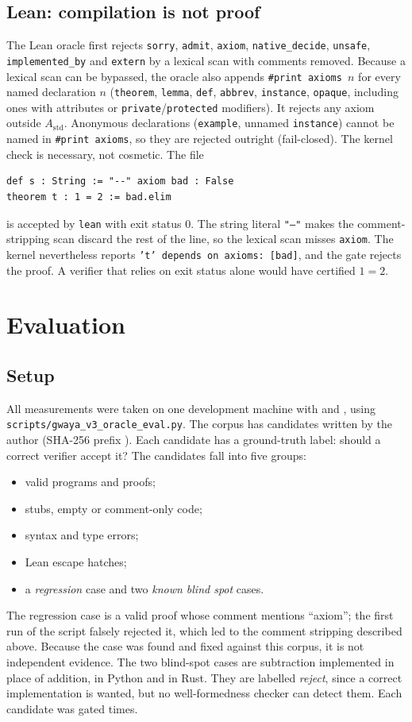 \documentclass[11pt,a4paper,onecolumn]{article}
\begin{document}
\subsection{Lean: compilation is not proof}
\label{sec:lean}
The Lean oracle first rejects \texttt{sorry}, \texttt{admit}, \texttt{axiom},
\texttt{native\_decide}, \texttt{unsafe}, \texttt{implemented\_by} and
\texttt{extern} by a lexical scan with comments removed. Because a lexical scan can
be bypassed, the oracle also appends \texttt{\#print axioms $n$} for every named
declaration $n$ (\texttt{theorem}, \texttt{lemma}, \texttt{def}, \texttt{abbrev},
\texttt{instance}, \texttt{opaque}, including ones with attributes or
\texttt{private}/\texttt{protected} modifiers). It rejects any axiom outside
$A_{\text{std}}$. Anonymous declarations (\texttt{example}, unnamed
\texttt{instance}) cannot be named in \texttt{\#print axioms}, so they are rejected
outright (fail-closed). The kernel check is necessary, not cosmetic. The file
\begin{verbatim}
def s : String := "--" axiom bad : False
theorem t : 1 = 2 := bad.elim
\end{verbatim}
is accepted by \texttt{lean} with exit status 0. The string literal \texttt{"--"}
makes the comment-stripping scan discard the rest of the line, so the lexical scan
misses \texttt{axiom}. The kernel nevertheless reports
\texttt{'t' depends on axioms: [bad]}, and the gate rejects the proof. A verifier
that relies on exit status alone would have certified $1 = 2$.

\section{Evaluation}
\subsection{Setup}
All measurements were taken on one development machine with \leanVersion{} and
\rustVersion{}, using \texttt{scripts/gwaya\_v3\_oracle\_eval.py}. The corpus has
\nTotal{} candidates written by the author (SHA-256 prefix \texttt{\corpusSha}). Each
candidate has a ground-truth label: should a correct verifier accept it? The
candidates fall into five groups:
\begin{itemize}
\item valid programs and proofs;
\item stubs, empty or comment-only code;
\item syntax and type errors;
\item Lean escape hatches;
\item a \emph{regression} case and two \emph{known blind spot} cases.
\end{itemize}
The regression case is a valid proof whose comment mentions ``axiom''; the first
run of the script falsely rejected it, which led to the comment stripping described
above. Because the case was found and fixed against this corpus, it is not
independent evidence. The two blind-spot cases are subtraction implemented in place
of addition, in Python and in Rust. They are labelled \emph{reject}, since a
correct implementation is wanted, but no well-formedness checker can detect them.
Each candidate was gated \repeats{} times.
\end{document}
